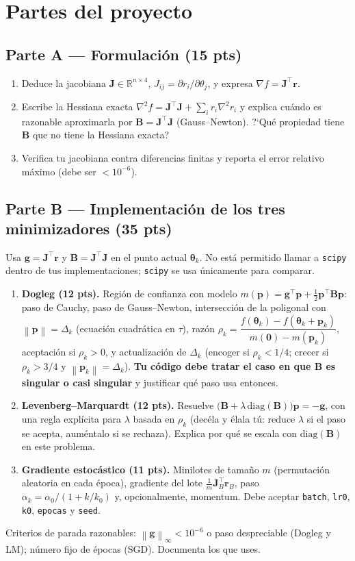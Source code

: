 \documentclass[11pt,letterpaper]{article}
\newcommand{\tht}{\boldsymbol{\theta}}
\newcommand{\Jm}{\mathbf{J}}
\newcommand{\rvec}{\mathbf{r}}
\newcommand{\gvec}{\mathbf{g}}
\newcommand{\pvec}{\mathbf{p}}
\newcommand{\norm}[1]{\left\lVert #1\right\rVert}
\begin{document}
\section{Partes del proyecto}

\subsection*{Parte A --- Formulaci\'on (15 pts)}
\begin{enumerate}[label=A\arabic*.]
\item Deduce la jacobiana $\Jm\in\mathbb{R}^{n\times 4}$, $J_{ij}=\partial r_i/\partial\theta_j$, y expresa
$\nabla f=\Jm^\top\rvec$.
\item Escribe la Hessiana exacta $\nabla^2 f=\Jm^\top\Jm+\sum_i r_i\nabla^2 r_i$ y explica cu\'ando es razonable
aproximarla por $\mathbf B=\Jm^\top\Jm$ (Gauss--Newton). ?`Qu\'e propiedad tiene $\mathbf B$ que no tiene la Hessiana
exacta?
\item Verifica tu jacobiana contra diferencias finitas y reporta el error relativo m\'aximo (debe ser
$<10^{-6}$).
\end{enumerate}

\subsection*{Parte B --- Implementaci\'on de los tres minimizadores (35 pts)}
Usa $\gvec=\Jm^\top\rvec$ y $\mathbf B=\Jm^\top\Jm$ en el punto actual $\tht_k$. No est\'a permitido llamar a
\texttt{scipy} dentro de tus implementaciones; \texttt{scipy} se usa \'unicamente para comparar.
\begin{enumerate}[label=B\arabic*.]
\item \textbf{Dogleg (12 pts).} Regi\'on de confianza con modelo $m(\pvec)=\gvec^\top\pvec+\tfrac12\pvec^\top\mathbf B\pvec$:
paso de Cauchy, paso de Gauss--Newton, intersecci\'on de la poligonal con $\norm{\pvec}=\Delta_k$ (ecuaci\'on
cuadr\'atica en $\tau$), raz\'on $\rho_k=\dfrac{f(\tht_k)-f(\tht_k+\pvec_k)}{m(\mathbf 0)-m(\pvec_k)}$, aceptaci\'on si
$\rho_k>0$, y actualizaci\'on de $\Delta_k$ (encoger si $\rho_k<1/4$; crecer si $\rho_k>3/4$ y $\norm{\pvec_k}=\Delta_k$).
\textbf{Tu c\'odigo debe tratar el caso en que $\mathbf B$ es singular o casi singular} y justificar qu\'e paso usa
entonces.
\item \textbf{Levenberg--Marquardt (12 pts).} Resuelve
$\bigl(\mathbf B+\lambda\,\mathrm{diag}(\mathbf B)\bigr)\pvec=-\gvec$, con una regla expl\'icita para $\lambda$ basada en
$\rho_k$ (dec\'ela y \'elala t\'u: reduce $\lambda$ si el paso se acepta, aum\'entalo si se rechaza). Explica por
qu\'e se escala con $\mathrm{diag}(\mathbf B)$ en este problema.
\item \textbf{Gradiente estoc\'astico (11 pts).} Minilotes de tama\~no $m$ (permutaci\'on aleatoria en cada
\'epoca), gradiente del lote $\frac1m\Jm_B^\top\rvec_B$, paso $\alpha_k=\alpha_0/(1+k/k_0)$ y, opcionalmente,
momentum. Debe aceptar \texttt{batch}, \texttt{lr0}, \texttt{k0}, \texttt{epocas} y \texttt{seed}.
\end{enumerate}
Criterios de parada razonables: $\norm{\gvec}_\infty<10^{-6}$ o paso despreciable (Dogleg y LM); n\'umero fijo de
\'epocas (SGD). Documenta los que uses.
\end{document}
